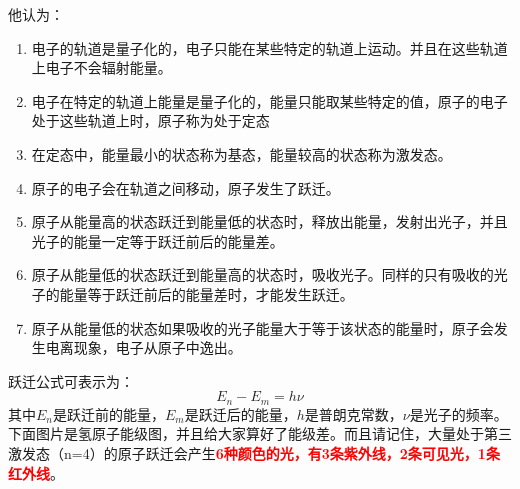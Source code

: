 \documentclass[12pt,a4paper]{article}
\begin{document}
他认为：
\begin{tcolorbox}[colback=yellow!20, colframe=red!75!black, title=考试重点]
    \begin{enumerate}
        \item 电子的轨道是量子化的，电子只能在某些特定的轨道上运动。并且在这些轨道上电子不会辐射能量。
        \item 电子在特定的轨道上能量是量子化的，能量只能取某些特定的值，原子的电子处于这些轨道上时，原子称为处于定态
        \item 在定态中，能量最小的状态称为基态，能量较高的状态称为激发态。
        \item 原子的电子会在轨道之间移动，原子发生了跃迁。
        \item 原子从能量高的状态跃迁到能量低的状态时，释放出能量，发射出光子，并且光子的能量一定等于跃迁前后的能量差。
        \item 原子从能量低的状态跃迁到能量高的状态时，吸收光子。同样的只有吸收的光子的能量等于跃迁前后的能量差时，才能发生跃迁。
        \item 原子从能量低的状态如果吸收的光子能量大于等于该状态的能量时，原子会发生电离现象，电子从原子中逸出。
    \end{enumerate}
\end{tcolorbox}
跃迁公式可表示为：
\begin{equation*}
    E_n - E_m = h \nu
\end{equation*}
其中$E_n$是跃迁前的能量，$E_m$是跃迁后的能量，$h$是普朗克常数，$\nu$是光子的频率。
\\
下面图片是氢原子能级图，并且给大家算好了能级差。而且请记住，大量处于第三激发态（n=4）的原子跃迁会产生\textbf{\textcolor{red}{6种颜色的光，有3条紫外线，2条可见光，1条红外线}}。
\end{document}

